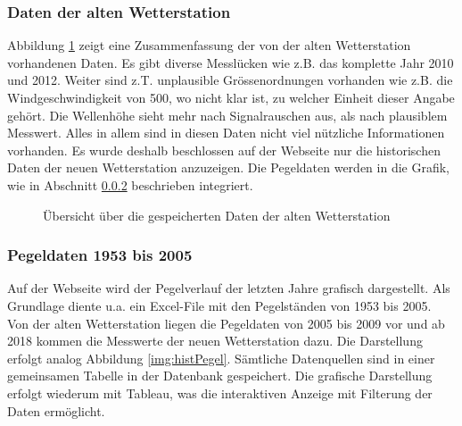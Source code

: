 \subsubsection{Daten der alten Wetterstation}
Abbildung \ref{img:histAlt} zeigt eine Zusammenfassung der von der alten Wetterstation vorhandenen Daten. Es gibt diverse Messlücken wie z.B. das komplette Jahr 2010 und 2012. Weiter sind z.T. unplausible Grössenordnungen vorhanden wie z.B. die Windgeschwindigkeit von 500, wo nicht klar ist, zu welcher Einheit dieser Angabe gehört. Die Wellenhöhe sieht mehr nach Signalrauschen aus, als nach plausiblem Messwert. Alles in allem sind in diesen Daten nicht viel nützliche Informationen vorhanden. Es wurde deshalb beschlossen auf der Webseite nur die historischen Daten der neuen Wetterstation anzuzeigen. Die Pegeldaten werden in die Grafik, wie in Abschnitt \ref{subsec:pegelhistory} beschrieben integriert.

\begin{figure}[h!]
	\centering
	\caption{Übersicht über die gespeicherten Daten der alten Wetterstation}
	\label{img:histAlt}
\end{figure}



\subsubsection{Pegeldaten 1953 bis 2005}
\label{subsec:pegelhistory}
Auf der Webseite wird der Pegelverlauf der letzten Jahre grafisch dargestellt. Als Grundlage diente u.a. ein Excel-File mit den Pegelständen von 1953 bis 2005. Von der alten Wetterstation liegen die Pegeldaten von 2005 bis 2009 vor und ab 2018 kommen die Messwerte der neuen Wetterstation dazu. Die Darstellung erfolgt analog Abbildung \ref{img:histPegel}. Sämtliche Datenquellen sind in einer gemeinsamen Tabelle in der Datenbank gespeichert. Die grafische Darstellung erfolgt wiederum mit Tableau, was die interaktiven Anzeige mit Filterung der Daten ermöglicht.

